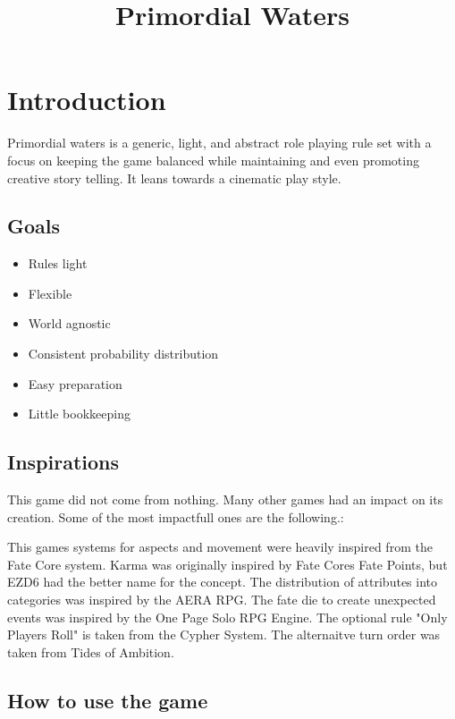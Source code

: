 \documentclass[11pt]{article}
\date{}
\title{Primordial Waters}
\begin{document}
\maketitle
\tableofcontents

{

\section{Introduction}
\label{sec:org559fe43}

Primordial waters is a generic, light, and abstract role playing rule set with a focus on keeping the game balanced while maintaining and even promoting creative story telling. It leans towards a cinematic play style.

\subsection{Goals}
\label{sec:org05a1b68}

\begin{itemize}
\item Rules light
\item Flexible
\item World agnostic
\item Consistent probability distribution
\item Easy preparation
\item Little bookkeeping
\end{itemize}

\subsection{Inspirations}
\label{sec:orgdc6f25e}

This game did not come from nothing. Many other games had an impact on its creation. Some of the most impactfull ones are the following.:

This games systems for aspects and movement were heavily inspired from the Fate Core system.
Karma was originally inspired by Fate Cores Fate Points, but EZD6 had the better name for the concept.
The distribution of attributes into categories was inspired by the AERA RPG.
The fate die to create unexpected events was inspired by the One Page Solo RPG Engine.
The optional rule "Only Players Roll" is taken from the Cypher System.
The alternaitve turn order was taken from Tides of Ambition.

\subsection{How to use the game}
\label{sec:org183db2a}

}
\end{document}
